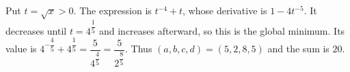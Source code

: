 Put $t=\sqrt x>0$. The expression is $t^{-4}+t$, whose derivative is $1-4t^{-5}$. It decreases until $t=4^{\dfrac{1}{5}}$ and increases afterward, so this is the global minimum. Its value is $4^{-\dfrac{4}{5}}+4^{\dfrac{1}{5}}=\dfrac{5}{4^{\dfrac{4}{5}}}=\dfrac{5}{2^{\dfrac{8}{5}}}$. Thus $(a,b,c,d)=(5,2,8,5)$ and the sum is $\boxed{20}$.
